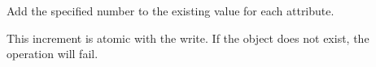 Add the specified number to the existing value for each attribute.

This increment is atomic with the write.  If the object does not exist, the
operation will fail.




